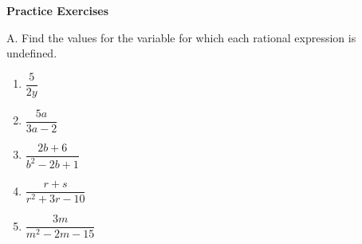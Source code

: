 \textbf{Practice Exercises}

\vspce

A. Find the values for the variable for which each rational expression is undefined. 
\begin{enumerate}[label = \arabic*. ]
\item \hspce $\dfrac{5}{2y}$ 
\item \hspce $\dfrac{5a}{3a-2}$ 
\item \hspce $\dfrac{2b+6}{b^2-2b+1}$ 
\item \hspce $\dfrac{r+s}{r^2+3r-10}$ 
\item \hspce $\dfrac{3m}{m^2-2m-15}$ 
\end{enumerate} 